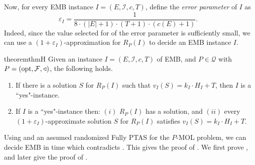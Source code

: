 \documentclass[11pt,letter]{article}
\newcommand{\opt}{\textnormal{opt}}
\newcommand{\cQ}{{\mathcal{Q}}}
\newcommand{\cI}{{\mathcal{I}}}
\newcommand{\cF}{{\mathcal{F}}}
\newcommand{\eps}{{\varepsilon}}
\begin{document}
Now, for every EMB instance $I =(E,\cI,c,T)$, define the {\em error parameter} of $I$ as \begin{equation}
\label{eq:epsI}
\eps_I =  \frac{1}{8 \cdot (|E|+1) \cdot (T+1) \cdot \left(c(E)+1\right)}.
\end{equation}
Indeed, since the value selected for of the error parameter is sufficiently small, we can use a $(1+\eps_I)$-approximation for $R_P(I)$ to decide an EMB instance $I$.  
\begin{restatable}{theorem}{thmH}
	\label{thm:H}
	Given an instance $I =(E,\cI,c,T)$ of \textnormal{EMB}, and $P \in \cQ$ with $P = (\opt,\cF,\triangleleft)$, the following holds. 
	\begin{enumerate}
		\item If there is a solution $S$ for $R_P(I)$ such that $v_I(S) = k_I \cdot H_I +T$, then $I$ is a ``yes"-instance.  \label{h:1}
		\item  If $I$ is a ``yes"-instance then: %
		$(i)$ $R_P(I)$ has a solution, and $(ii)$ every $(1+\eps_I)$-approximate solution $S$ for $R_P(I)$ satisfies $v_I(S) = k_I \cdot H_I +T$. \label{h:2}
	\end{enumerate}
\end{restatable}
Using  and an assumed randomized Fully PTAS for the $P$-MOL problem, we can decide EMB in time which contradicts . This gives the proof of . We first prove , and later give the proof of .   

 \thmMain*
\end{document}
